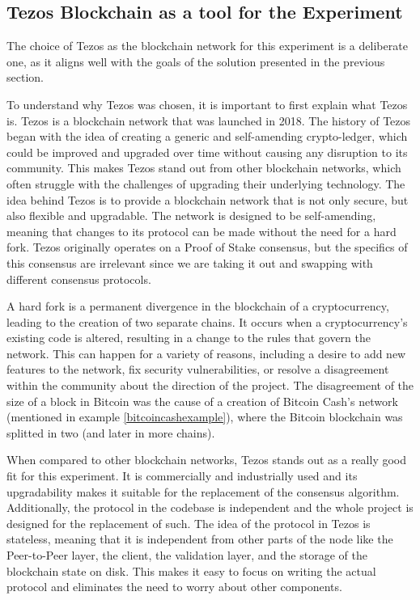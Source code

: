 \subsection*{\textbf{Tezos Blockchain as a tool for the Experiment}}
The choice of Tezos as the blockchain network for this experiment is a deliberate one, as it aligns well with the goals of the solution presented in the previous section.

To understand why Tezos was chosen, it is important to first explain what Tezos is. Tezos is a blockchain network that was launched in 2018. The history of Tezos began with the idea of creating a generic and self-amending crypto-ledger, which could be improved and upgraded over time without causing any disruption to its community. This makes Tezos stand out from other blockchain networks, which often struggle with the challenges of upgrading their underlying technology. The idea behind Tezos is to provide a blockchain network that is not only secure, but also flexible and upgradable. The network is designed to be self-amending, meaning that changes to its protocol can be made without the need for a hard fork. Tezos originally operates on a Proof of Stake consensus, but the specifics of this consensus are irrelevant since we are taking it out and swapping with different consensus protocols.

A hard fork is a permanent divergence in the blockchain of a cryptocurrency, leading to the creation of two separate chains. It occurs when a cryptocurrency's existing code is altered, resulting in a change to the rules that govern the network. This can happen for a variety of reasons, including a desire to add new features to the network, fix security vulnerabilities, or resolve a disagreement within the community about the direction of the project. The disagreement of the size of a block in Bitcoin was the cause of a creation of Bitcoin Cash's network (mentioned in example \ref{bitcoincashexample}), where the Bitcoin blockchain was splitted in two (and later in more chains).

When compared to other blockchain networks, Tezos stands out as a really good fit for this experiment. It is commercially and industrially used and its upgradability makes it suitable for the replacement of the consensus algorithm. Additionally, the protocol in the codebase is independent and the whole project is designed for the replacement of such. 
The idea of the protocol in Tezos is stateless, meaning that it is independent from other parts of the node like the Peer-to-Peer layer, the client, the validation layer, and the storage of the blockchain state on disk.
This makes it easy to focus on writing the actual protocol and eliminates the need to worry about other components.

